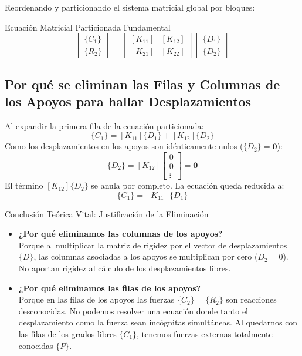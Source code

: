 \documentclass[11pt,a4paper]{article}
\begin{document}
Reordenando y particionando el sistema matricial global por bloques:
\begin{formulabox}{Ecuación Matricial Particionada Fundamental}
\begin{equation}
    \begin{bmatrix}
        \{C_1\} \\
        \hline
        \{R_2\}
    \end{bmatrix}
    =
    \begin{bmatrix}
        [K_{11}] & [K_{12}] \\
        \hline
        [K_{21}] & [K_{22}]
    \end{bmatrix}
    \begin{bmatrix}
        \{D_1\} \\
        \hline
        \{D_2\}
    \end{bmatrix}
\end{equation}
\end{formulabox}

\subsection{Por qué se eliminan las Filas y Columnas de los Apoyos para hallar Desplazamientos}
Al expandir la primera fila de la ecuación particionada:
\begin{equation}
    \{C_1\} = [K_{11}] \{D_1\} + [K_{12}] \{D_2\}
\end{equation}
Como los desplazamientos en los apoyos son idénticamente nulos ($\{D_2\} = \mathbf{0}$):
\begin{equation}
    [K_{12}] \{D_2\} = [K_{12}] \begin{bmatrix} 0 \\ 0 \\ \vdots \end{bmatrix} = \mathbf{0}
\end{equation}
El término $[K_{12}] \{D_2\}$ se anula por completo. La ecuación queda reducida a:
\begin{equation}
    \{C_1\} = [K_{11}] \{D_1\}
\end{equation}

\begin{conceptbox}{Conclusión Teórica Vital: Justificación de la Eliminación}
\begin{itemize}
    \item \textbf{¿Por qué eliminamos las columnas de los apoyos?} \\
    Porque al multiplicar la matriz de rigidez por el vector de desplazamientos $\{D\}$, las columnas asociadas a los apoyos se multiplican por cero ($D_2 = 0$). No aportan rigidez al cálculo de los desplazamientos libres.
    \item \textbf{¿Por qué eliminamos las filas de los apoyos?} \\
    Porque en las filas de los apoyos las fuerzas $\{C_2\} = \{R_2\}$ son reacciones desconocidas. No podemos resolver una ecuación donde tanto el desplazamiento como la fuerza sean incógnitas simultáneas. Al quedarnos con las filas de los grados libres $\{C_1\}$, tenemos fuerzas externas totalmente conocidas $\{P\}$.
\end{itemize}
\end{conceptbox}
\end{document}
